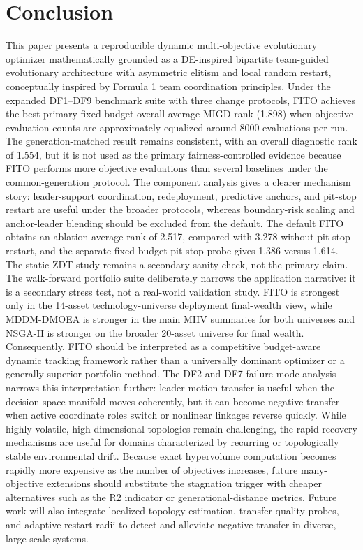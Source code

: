 \documentclass[preprint,12pt]{elsarticle}
\begin{document}
\section{Conclusion}
\label{sec:conclusion}

This paper presents a reproducible dynamic multi-objective evolutionary optimizer mathematically grounded as a DE-inspired bipartite team-guided evolutionary architecture with asymmetric elitism and local random restart, conceptually inspired by Formula 1 team coordination principles. Under the expanded DF1--DF9 benchmark suite with three change protocols, FITO achieves the best primary fixed-budget overall average MIGD rank (1.898) when objective-evaluation counts are approximately equalized around 8000 evaluations per run. The generation-matched result remains consistent, with an overall diagnostic rank of 1.554, but it is not used as the primary fairness-controlled evidence because FITO performs more objective evaluations than several baselines under the common-generation protocol. The component analysis gives a clearer mechanism story: leader-support coordination, redeployment, predictive anchors, and pit-stop restart are useful under the broader protocols, whereas boundary-risk scaling and anchor-leader blending should be excluded from the default. The default FITO obtains an ablation average rank of 2.517, compared with 3.278 without pit-stop restart, and the separate fixed-budget pit-stop probe gives 1.386 versus 1.614. The static ZDT study remains a secondary sanity check, not the primary claim. The walk-forward portfolio suite deliberately narrows the application narrative: it is a secondary stress test, not a real-world validation study. FITO is strongest only in the 14-asset technology-universe deployment final-wealth view, while MDDM-DMOEA is stronger in the main MHV summaries for both universes and NSGA-II is stronger on the broader 20-asset universe for final wealth. Consequently, FITO should be interpreted as a competitive budget-aware dynamic tracking framework rather than a universally dominant optimizer or a generally superior portfolio method. The DF2 and DF7 failure-mode analysis narrows this interpretation further: leader-motion transfer is useful when the decision-space manifold moves coherently, but it can become negative transfer when active coordinate roles switch or nonlinear linkages reverse quickly. While highly volatile, high-dimensional topologies remain challenging, the rapid recovery mechanisms are useful for domains characterized by recurring or topologically stable environmental drift. Because exact hypervolume computation becomes rapidly more expensive as the number of objectives increases, future many-objective extensions should substitute the stagnation trigger with cheaper alternatives such as the R2 indicator or generational-distance metrics. Future work will also integrate localized topology estimation, transfer-quality probes, and adaptive restart radii to detect and alleviate negative transfer in diverse, large-scale systems.
\end{document}
